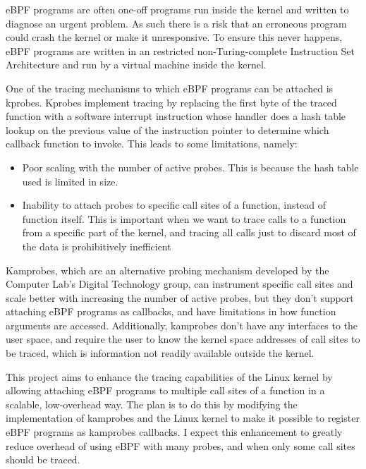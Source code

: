     eBPF programs are often one-off programs run inside the kernel and written to diagnose an urgent problem. 
    As such there is a risk that an erroneous program could crash the kernel or make it unresponsive.
    To ensure this never happens, eBPF programs are written in an restricted non-Turing-complete 
    Instruction Set Architecture and run by a virtual machine inside the kernel.

    One of the tracing mechanisms to which eBPF programs can be attached is kprobes. 
    Kprobes implement tracing by replacing the first byte of the traced function with a software interrupt 
    instruction whose handler does a hash table lookup on the 
    previous value of the instruction pointer to determine which callback function to invoke.
    This leads to some limitations, namely:

    \vspace{-0.60em}
    \begin{itemize}
        \setlength{\itemsep}{-0.3em}
        \item Poor scaling with the number of active probes. This is because the hash table used is limited in size.
        \item Inability to attach probes to specific call sites of a function, instead of function itself. 
        This is important when we want to trace calls to a function from a specific part of the kernel,
        and tracing all calls just to discard most of the data is prohibitively inefficient
    \end{itemize}

    Kamprobes, which are an alternative probing mechanism developed by the Computer Lab's Digital Technology group, 
    can instrument specific call sites and scale better with increasing the number of active probes, 
    but they don't support attaching eBPF programs as callbacks, and have limitations in how function arguments
    are accessed. Additionally, kamprobes don't have any interfaces to the user space, 
    and require the user to know the kernel space addresses of call sites to be traced,
    which is information not readily available outside the kernel.

    This project aims to enhance the tracing capabilities of the Linux kernel by allowing attaching eBPF programs
    to multiple call sites of a function in a scalable, low-overhead way. 
    The plan is to do this by modifying the implementation of
    kamprobes and the Linux kernel to make it possible to register eBPF programs as kamprobes callbacks.
    I expect this enhancement to greatly reduce overhead of using eBPF with many probes, and when only some call sites
    should be traced.

